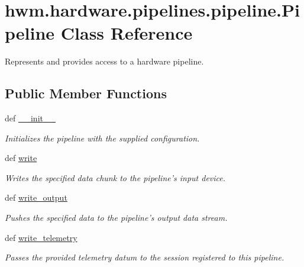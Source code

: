 \hypertarget{classhwm_1_1hardware_1_1pipelines_1_1pipeline_1_1_pipeline}{\section{hwm.\-hardware.\-pipelines.\-pipeline.\-Pipeline Class Reference}
\label{classhwm_1_1hardware_1_1pipelines_1_1pipeline_1_1_pipeline}
}


Represents and provides access to a hardware pipeline.  


\subsection*{Public Member Functions}
\begin{DoxyCompactItemize}
\item 
def \hyperlink{classhwm_1_1hardware_1_1pipelines_1_1pipeline_1_1_pipeline_aed56445fa619c9390ffeba92d924c861}{\-\_\-\-\_\-init\-\_\-\-\_\-}
\begin{DoxyCompactList}\small\item\em Initializes the pipeline with the supplied configuration. \end{DoxyCompactList}\item 
def \hyperlink{classhwm_1_1hardware_1_1pipelines_1_1pipeline_1_1_pipeline_aad6d60b4f9e493b764b98858518c050b}{write}
\begin{DoxyCompactList}\small\item\em Writes the specified data chunk to the pipeline's input device. \end{DoxyCompactList}\item 
def \hyperlink{classhwm_1_1hardware_1_1pipelines_1_1pipeline_1_1_pipeline_a6105f9720a74d918e3a0b13f727b96a8}{write\-\_\-output}
\begin{DoxyCompactList}\small\item\em Pushes the specified data to the pipeline's output data stream. \end{DoxyCompactList}\item 
def \hyperlink{classhwm_1_1hardware_1_1pipelines_1_1pipeline_1_1_pipeline_a2d55701f3f441a60d0cf807b26e2fa05}{write\-\_\-telemetry}
\begin{DoxyCompactList}\small\item\em Passes the provided telemetry datum to the session registered to this pipeline. \end{DoxyCompactList}\item 

\end{DoxyCompactItemize}
